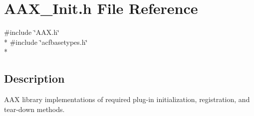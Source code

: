 \hypertarget{a00253}{}\section{A\+A\+X\+\_\+\+Init.\+h File Reference}
\label{a00253}
{\ttfamily \#include \char`\"{}A\+A\+X.\+h\char`\"{}}\\*
{\ttfamily \#include \char`\"{}acfbasetypes.\+h\char`\"{}}\\*


\subsection{Description}
A\+A\+X library implementations of required plug-\/in initialization, registration, and tear-\/down methods. 

